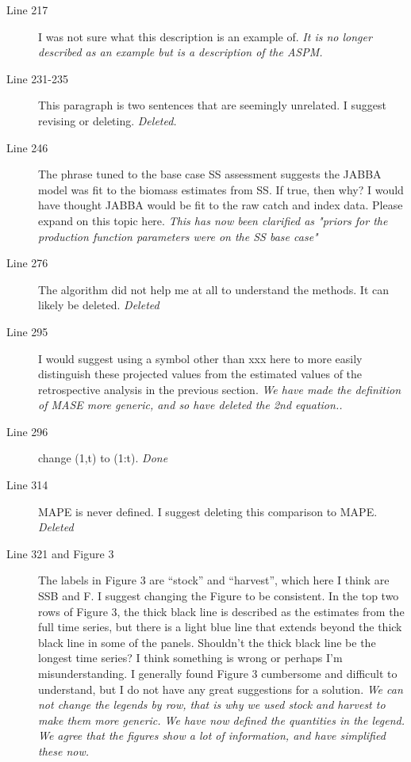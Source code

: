 \begin{itemize}
\begin{description}
\item[Line 217] I was not sure what this description is an example of.
\textit{\newline It is no longer described as an example but is a description of the ASPM.}

\item[Line 231-235] This paragraph is two sentences that are seemingly unrelated. I suggest revising or deleting.
\textit{\newline Deleted.}

\item[Line 246] The phrase tuned to the base case SS assessment suggests the JABBA model was fit to the biomass estimates from SS. If true, then why? I would have thought JABBA would be fit to the raw catch and index data. Please expand on this topic here.
\textit{\newline This has now been clarified as "priors for the production function parameters were on the SS base case"}

\item[Line 276] The algorithm did not help me at all to understand the methods. It can likely be deleted.
\textit{\newline Deleted}

\item[Line 295] I would suggest using a symbol other than xxx here to more easily distinguish these projected
values from the estimated values of the retrospective analysis in the previous section.
\textit{\newline We have made the definition of MASE more generic, and so have deleted the 2nd equation..}

\item[Line 296] change (1,t) to (1:t).
\textit{\newline Done}

\item[Line 314] MAPE is never defined. I suggest deleting this comparison to MAPE.
\textit{\newline Deleted}

\item[Line 321 and Figure 3] The labels in Figure 3 are “stock” and “harvest”, which here I think are SSB and F. I suggest changing the Figure to be consistent. In the top two rows of Figure 3, the thick black line is described as the estimates from the full time series, but there is a light blue line that extends beyond the thick black line in some of the panels. Shouldn’t the thick black line be the longest time series? I think something is wrong or perhaps I’m misunderstanding. I generally found Figure 3 cumbersome and
difficult to understand, but I do not have any great suggestions for a solution.
\textit{\newline We can not change the legends by row, that is why we used stock and harvest to make them more generic. We have now defined the quantities in the legend. We agree that the figures show a lot of information, and have simplified these now.}


\end{description}
\end{itemize}

